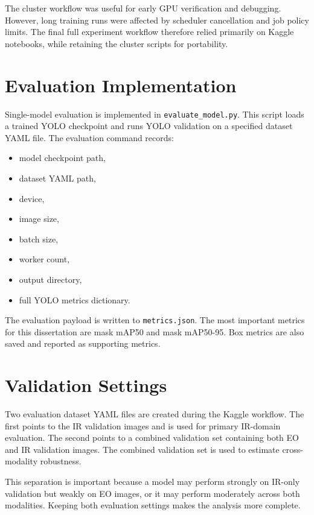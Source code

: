 The cluster workflow was useful for early GPU verification and debugging. However, long training runs were affected by scheduler cancellation and job policy limits. The final full experiment workflow therefore relied primarily on Kaggle notebooks, while retaining the cluster scripts for portability.

\section{Evaluation Implementation}

Single-model evaluation is implemented in \texttt{evaluate\_model.py}. This script loads a trained YOLO checkpoint and runs YOLO validation on a specified dataset YAML file. The evaluation command records:

\begin{itemize}
    \item model checkpoint path,
    \item dataset YAML path,
    \item device,
    \item image size,
    \item batch size,
    \item worker count,
    \item output directory,
    \item full YOLO metrics dictionary.
\end{itemize}

The evaluation payload is written to \texttt{metrics.json}. The most important metrics for this dissertation are mask mAP50 and mask mAP50-95. Box metrics are also saved and reported as supporting metrics.

\section{Validation Settings}

Two evaluation dataset YAML files are created during the Kaggle workflow. The first points to the IR validation images and is used for primary IR-domain evaluation. The second points to a combined validation set containing both EO and IR validation images. The combined validation set is used to estimate cross-modality robustness.

This separation is important because a model may perform strongly on IR-only validation but weakly on EO images, or it may perform moderately across both modalities. Keeping both evaluation settings makes the analysis more complete.

